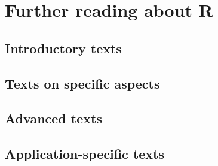 
\chapter{Further reading about R}\label{chap:R:readings}

\section{Introductory texts}

\section{Texts on specific aspects}

\section{Advanced texts}

\section{Application-specific texts}

\nocite{*}
